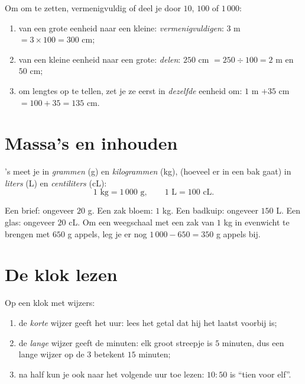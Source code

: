 \begin{method}\label{met:g3:measure:convert}
Om om te zetten, vermenigvuldig of deel je door $10$, $100$ of $1\,000$:
\begin{enumerate}
  \item van een grote eenheid naar een kleine: \emph{vermenigvuldigen}:
        $3$ m $= 3 \times 100 = 300$ cm;
  \item van een kleine eenheid naar een grote: \emph{delen}:
        $250$ cm $= 250 \div 100 = 2$ m en $50$ cm;
  \item om lengtes op te tellen, zet je ze eerst in \emph{dezelfde}
        eenheid om: $1$ m $+ 35$ cm $= 100 + 35 = 135$ cm.
\end{enumerate}
\end{method}

\section{Massa's en inhouden}

\begin{definition}\label{def:g3:measure:mass}
's meet je in \emph{grammen} (g) en \emph{kilogrammen} (kg),
 (hoeveel er in een bak gaat) in \emph{liters} (L) en
\emph{centiliters} (cL):
\[
1 \text{ kg} = 1\,000 \text{ g},
\qquad
1 \text{ L} = 100 \text{ cL}.
\]
\end{definition}

\begin{example}\label{ex:g3:measure:mass}
Een brief: ongeveer $20$ g. Een zak bloem: $1$ kg. Een badkuip: ongeveer
$150$ L. Een glas: ongeveer $20$ cL. Om een weegschaal met een zak van
$1$ kg in evenwicht te brengen met $650$ g appels, leg je er nog
$1\,000 - 650 = 350$ g appels bij.
\end{example}

\section{De klok lezen}

\begin{method}\label{met:g3:measure:clock}
Op een klok met wijzers:
\begin{enumerate}
  \item de \emph{korte} wijzer geeft het uur: lees het getal dat hij het
        laatst voorbij is;
  \item de \emph{lange} wijzer geeft de minuten: elk groot streepje is
        $5$ minuten, dus een lange wijzer op de $3$ betekent $15$
        minuten;
  \item na half kun je ook naar het volgende uur toe lezen: $10{:}50$ is
        ``tien voor elf''.
\end{enumerate}
\end{method}

